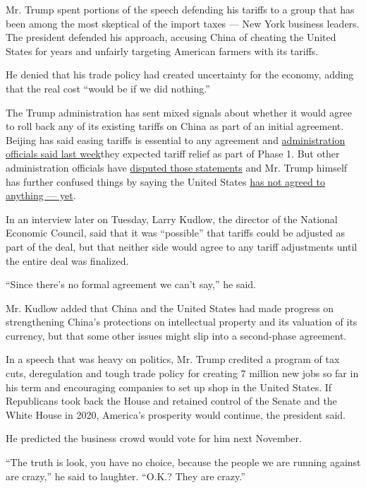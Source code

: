 Mr. Trump spent portions of the speech defending his tariffs to a group
that has been among the most skeptical of the import taxes --- New York
business leaders. The president defended his approach, accusing China of
cheating the United States for years and unfairly targeting American
farmers with its tariffs.

He denied that his trade policy had created uncertainty for the economy,
adding that the real cost ``would be if we did nothing.''

The Trump administration has sent mixed signals about whether it would
agree to roll back any of its existing tariffs on China as part of an
initial agreement. Beijing has said easing tariffs is essential to any
agreement and
\href{https://www.nytimes.com/2019/11/07/business/china-trade-trump.html}{administration
officials said last week}they expected tariff relief as part of Phase 1.
But other administration officials have
\href{https://www.nytimes.com/2019/11/08/us/politics/trump-china-tariffs.html}{disputed
those statements} and Mr. Trump himself has further confused things by
saying the United States
\href{https://www.nytimes.com/2019/11/08/us/politics/trump-china-tariffs.html}{has
not agreed to anything --- yet}.

In an interview later on Tuesday, Larry Kudlow, the director of the
National Economic Council, said that it was ``possible'' that tariffs
could be adjusted as part of the deal, but that neither side would agree
to any tariff adjustments until the entire deal was finalized.

``Since there's no formal agreement we can't say,'' he said.

Mr. Kudlow added that China and the United States had made progress on
strengthening China's protections on intellectual property and its
valuation of its currency, but that some other issues might slip into a
second-phase agreement.

In a speech that was heavy on politics, Mr. Trump credited a program of
tax cuts, deregulation and tough trade policy for creating 7 million new
jobs so far in his term and encouraging companies to set up shop in the
United States. If Republicans took back the House and retained control
of the Senate and the White House in 2020, America's prosperity would
continue, the president said.

He predicted the business crowd would vote for him next November.

``The truth is look, you have no choice, because the people we are
running against are crazy,'' he said to laughter. ``O.K.? They are
crazy.''


